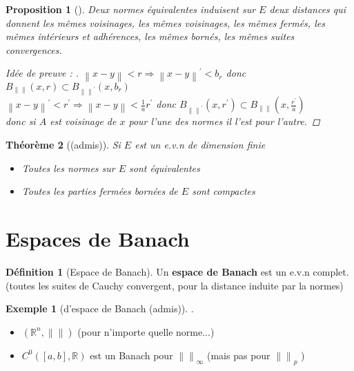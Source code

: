 \documentclass{article}
\theoremstyle{plain}%
\newtheorem{thm}{Théorème}[section]
\newtheorem{prop}[thm]{Proposition}
\theoremstyle{definition}
\newtheorem{defn}{Définition}[section]
\newtheorem{exmp}{Exemple}[section]
\theoremstyle{remark}
\begin{document}
\begin{prop}[]
	Deux normes équivalentes induisent sur $ E $ deux distances qui donnent les mêmes voisinages, les mêmes voisinages, les mêmes fermés, les mêmes intérieurs et adhérences, les mêmes bornés, les mêmes suites convergences.

	\begin{proof}[Idée de preuve : ]
		$ \left\| x-y \right\| < r \Rightarrow \left\| x - y \right\|^\prime < b_r $ donc $ B_{\left\|  \right\| } (x,r) \subset B_{\left\|  \right\| ^\prime } (x,b_r) $ \\
		$ \left\| x-y \right\| ^\prime  < r^\prime  \Rightarrow \left\| x - y \right\| < \frac{1}{a}r^\prime  $ donc $ B_{\left\|  \right\|^\prime  } (x,r^\prime ) \subset B_{\left\|  \right\| } (x,\frac{r^\prime }{a}) $ \\
		donc si $ A $ est voisinage de $ x $ pour l'une des normes il l'est pour l'autre.
	\end{proof}
\end{prop}

\begin{thm}[(admis)]
	Si $ E $ est un e.v.n de dimension finie 
	\begin{itemize}
		\item Toutes les normes sur $ E $ sont équivalentes
		\item Toutes les parties fermées bornées de $ E $ sont compactes
	\end{itemize}
\end{thm}

\section{Espaces de Banach}

\begin{defn}[Espace de Banach]
	Un \textbf{espace de Banach} est un e.v.n complet. (toutes les suites de Cauchy convergent, pour la distance induite par la normes)
\end{defn}

\begin{exmp}[d'espace de Banach (admis)]
	.\\
	\begin{itemize}
		\item $ (\mathbb{R}^n, \left\|  \right\| ) $ (pour n'importe quelle norme...)
		\item $ C^0 ([a,b], \mathbb{R}) $ est un Banach pour $ \left\|  \right\| _\infty  $ (mais pas pour $ \left\|  \right\| _p $ )
	\end{itemize}
\end{exmp}
\end{document}
